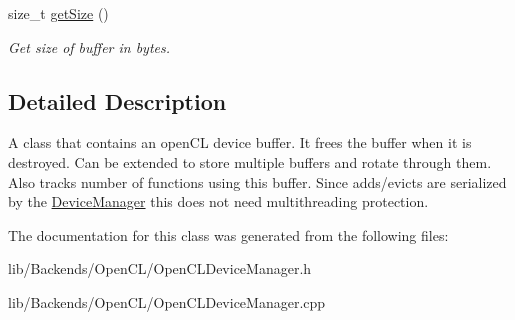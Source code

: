 \begin{DoxyCompactItemize}
\mbox{\label{classglow_1_1runtime_1_1_open_c_l_buffer_aec1060a0ecbdfc0ae6eb1653cf58d24b}} 
size\+\_\+t \hyperlink{classglow_1_1runtime_1_1_open_c_l_buffer_aec1060a0ecbdfc0ae6eb1653cf58d24b}{get\+Size} ()
\begin{DoxyCompactList}\small\item\em Get size of buffer in bytes. \end{DoxyCompactList}\end{DoxyCompactItemize}


\subsection{Detailed Description}
A class that contains an open\+CL device buffer. It frees the buffer when it is destroyed. Can be extended to store multiple buffers and rotate through them. Also tracks number of functions using this buffer. Since adds/evicts are serialized by the \hyperlink{classglow_1_1runtime_1_1_device_manager}{Device\+Manager} this does not need multithreading protection. 

The documentation for this class was generated from the following files\+:\begin{DoxyCompactItemize}
\item 
lib/\+Backends/\+Open\+C\+L/Open\+C\+L\+Device\+Manager.\+h\item 
lib/\+Backends/\+Open\+C\+L/Open\+C\+L\+Device\+Manager.\+cpp\end{DoxyCompactItemize}
